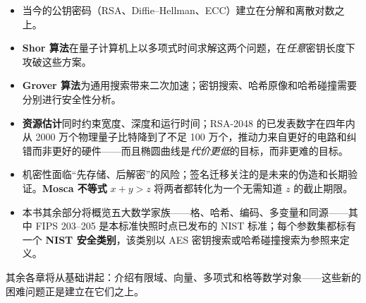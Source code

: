 \begin{itemize}
  \item 当今的公钥密码（RSA、Diffie--Hellman、ECC）建立在分解和离散对数之上。
  \item \textbf{Shor 算法}在量子计算机上以多项式时间求解这两个问题，在\emph{任意}密钥长度下攻破这些方案。
  \item \textbf{Grover 算法}为通用搜索带来二次加速；密钥搜索、哈希原像和哈希碰撞需要分别进行安全性分析。
  \item \textbf{资源估计}同时约束宽度、深度和运行时间；RSA-2048 的已发表数字在四年内从 2000 万个物理量子比特降到了不足 100 万个，推动力来自更好的电路和纠错而非更好的硬件——而且椭圆曲线是\emph{代价更低}的目标，而非更难的目标。
  \item 机密性面临“先存储、后解密”的风险；签名迁移关注的是未来的伪造和长期验证。\textbf{Mosca 不等式} $x + y > z$ 将两者都转化为一个无需知道 $z$ 的截止期限。
  \item 本书其余部分将概览五大数学家族——格、哈希、编码、多变量和同源——其中 FIPS 203--205 是本标准快照时点已发布的 NIST 标准；每个参数集都标有一个 \textbf{NIST 安全类别}，该类别以 AES 密钥搜索或哈希碰撞搜索为参照来定义。
\end{itemize}

其余各章将从基础讲起：介绍有限域、向量、多项式和格等数学对象——这些新的困难问题正是建立在它们之上。

\printbibliography[heading=chapterrefs]

